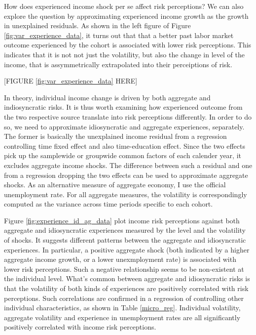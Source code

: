 \documentclass[12pt,notitlepage,onecolumn,aps,pra]{article}
\begin{document}
How does experienced income shock per se affect risk perceptions? We can
also explore the question by approximating experienced income growth as
the growth in unexplained residuals. As shown in the left figure of
Figure \ref{fig:var_experience_data}, it turns out that that a better
past labor market outcome experienced by the cohort is associated with
lower risk perceptions. This indicates that it is not not just the
volatility, but also the change in level of the income, that is
assymmetrically extrapolated into their perceiptions of risk.

\begin{center}
[FIGURE \ref{fig:var_experience_data} HERE]
\end{center}

In theory, individual income change is driven by both aggregate and
indiosyncratic risks. It is thus worth examining how experienced outcome
from the two respective source translate into risk perceptions
differently. In order to do so, we need to approximate idiosyncratic and
aggregate experiences, separately. The former is basically the
unexplained income residual from a regression controlling time fixed
effect and also time-education effect. Since the two effects pick up the
samplewide or groupwide common factors of each calender year, it
excludes aggregate income shocks. The difference between such a residual
and one from a regression dropping the two effects can be used to
approximate aggregate shocks. As an alternative measure of aggregate
economy, I use the official unemployment rate. For all aggregate
measures, the volatility is correspondingly computed as the variance
across time periods specific to each cohort.

Figure \ref{fig:experience_id_ag_data} plot income risk perceptions
against both aggregate and idiosyncratic experiences measured by the
level and the volatility of shocks. It suggests different patterns
between the aggregate and idiosyncratic experiences. In particular, a
positive aggregate shock (both indicated by a higher aggregate income
growth, or a lower unexmployment rate) is associated with lower risk
perceptions. Such a negative relationship seems to be non-existent at
the individual level. What's common between aggregate and idiosyncratic
risks is that the volatility of both kinds of experiences are positively
correlated with risk perceptions. Such correlations are confirmed in a
regression of controlling other individual characteristics, as shown in
Table \ref{micro_reg}. Individual volatility, aggregate volatility and
experience in unemployment rates are all significantly positively
correlated with income risk perceptions.
\end{document}
